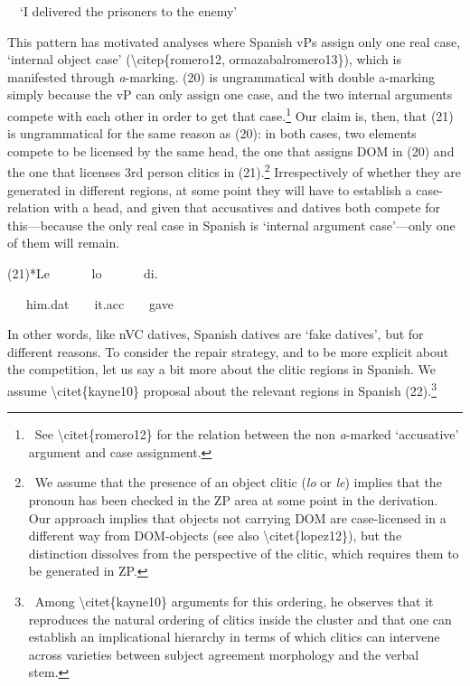 \documentclass[12pt]{article}
\newenvironment{styleStandard}{\setlength\leftskip{0cm}\setlength\rightskip{0cm}\setlength\parindent{0cm}\setlength\parfillskip{0pt plus 1fil}\setlength\parskip{0in plus 1pt}\writerlistparindent\writerlistleftskip\leavevmode\normalfont\normalsize\writerlistlabel\ignorespaces}{\unskip\vspace{0.111in plus 0.0111in}\par}
\newcommand\writerlistleftskip{}
\newcommand\writerlistparindent{}
\newcommand\writerlistlabel{}
\begin{document}
\begin{styleStandard}
\ \ ‘I delivered the prisoners to the enemy’
\end{styleStandard}

\begin{styleStandard}
This pattern has motivated analyses where Spanish vPs assign only one real case, ‘internal object case’ ({\textbackslash}citep\{romero12, ormazabalromero13\}), which is manifested through \textit{a}{}-marking. (20) is ungrammatical with double a-marking simply because the vP can only assign one case, and the two internal arguments compete with each other in order to get that case.\footnote{\ See {\textbackslash}citet\{romero12\} for the relation between the non \textit{a}{}-marked ‘accusative’ argument and case assignment. } Our claim is, then, that (21) is ungrammatical for the same reason as (20): in both cases, two elements compete to be licensed by the same head, the one that assigns DOM in (20) and the one that licenses 3rd person clitics in (21).\footnote{\ We assume that the presence of an object clitic (\textit{lo} or \textit{le}) implies that the pronoun has been checked in the ZP area at some point in the derivation. Our approach implies that objects not carrying DOM are case-licensed in a different way from DOM-objects (see also {\textbackslash}citet\{lopez12\}), but the distinction dissolves from the perspective of the clitic, which requires them to be generated in ZP.} Irrespectively of whether they are generated in different regions, at some point they will have to establish a case-relation with a head, and given that accusatives and datives both compete for this—because the only real case in Spanish is ‘internal argument case’—only one of them will remain.
\end{styleStandard}

\begin{styleStandard}
(21)*Le \ \ \ \ \ \ lo \ \ \ \ \ \ di.
\end{styleStandard}

\begin{styleStandard}
\ \  \ him.dat\ \ \ \ it.acc\ \ \ \ gave
\end{styleStandard}

\begin{styleStandard}
In other words, like nVC datives, Spanish datives are ‘fake datives’, but for different reasons. To consider the repair strategy, and to be more explicit about the competition, let us say a bit more about the clitic regions in Spanish. We assume {\textbackslash}citet\{kayne10\} proposal about the relevant regions in Spanish (22).\footnote{\ Among {\textbackslash}citet\{kayne10\} arguments for this ordering, he observes that it reproduces the natural ordering of clitics inside the cluster and that one can establish an implicational hierarchy in terms of which clitics can intervene across varieties between subject agreement morphology and the verbal stem. } \ 
\end{styleStandard}
\end{document}
